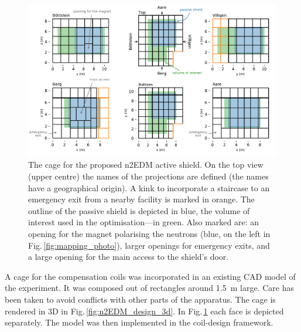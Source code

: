 \begin{figure}
  \centering
  \includegraphics[width=0.95\linewidth]{gfx/prototype/n2EDM_active_shield_all_faces.pdf}
  \caption{The cage for the proposed n2EDM active shield.
  On the top view (upper centre) the names of the projections are defined (the names have a geographical origin).
  A kink to incorporate a staircase to an emergency exit from a nearby facility is marked in orange.
  The outline of the passive shield is depicted in blue,
  the volume of interest used in the optimisation---in green.
  Also marked are: an opening for the magnet polarising the neutrons (blue, on the left in Fig.\,\ref{fig:mapping_photo}), larger openings for emergency exits, and a large opening for the main access to the shield's door.}\label{fig:n2EDM_design_top}
\end{figure}

A cage for the compensation coils was incorporated in an existing CAD model of the experiment.
It was composed out of rectangles around \SI{1.5}{\metre} large.
Care has been taken to avoid conflicts with other parts of the apparatus.
The cage is rendered in 3D in Fig.\,\ref{fig:n2EDM_design_3d}. In Fig.\,\ref{fig:n2EDM_design_top} each face is depicted separately. The model was then implemented in the coil-design framework.

